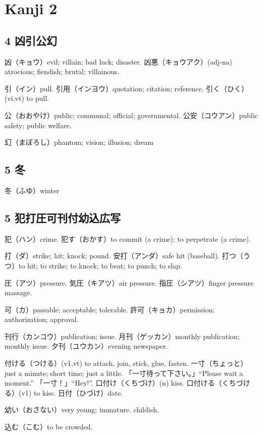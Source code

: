 \chapter{Kanji 2}

\section{4 凶引公幻}

凶（キョウ）evil; villain; bad luck; disaster.
凶悪（キョウアク）(adj-na) atrocious; fiendish; brutal; villainous.

引（イン）pull.
引用（インヨウ）quotation; citation; reference.
引く（ひく）(vi,vt) to pull.

公（おおやけ）public; communal; official; governmental.
公安（コウアン）public safety; public welfare.

幻（まぼろし）phantom; vision; illusion; dream

\section{5 冬}

冬（ふゆ）winter

\section{5 犯打圧可刊付幼込広写}

犯（ハン）crime.
犯す（おかす）to commit (a crime); to perpetrate (a crime).

打（ダ）strike; hit; knock; pound.
安打（アンダ）safe hit (baseball).
打つ（うつ）to hit; to strike; to knock; to beat; to punch; to slap.

圧（アツ）pressure.
気圧（キアツ）air pressure.
指圧（シアツ）finger pressure massage.

可（カ）passable; acceptable; tolerable.
許可（キョカ）permission; authorization; approval.

刊行（カンコウ）publication; issue.
月刊（ゲッカン）monthly publication; monthly issue.
夕刊（ユウカン）evening newspaper.

付ける（つける）(v1,vt) to attach, join, stick, glue, fasten.
一寸（ちょっと）just a minute; short time; just a little.
「一寸待って下さい。」``Please wait a moment.''
「一寸！」``Hey!''.
口付け（くちづけ）(n) kiss.
口付ける（くちづける）(v1) to kiss.
日付（ひづけ）date.

幼い（おさない）very young; immature. childish.

込む（こむ）to be crowded.

